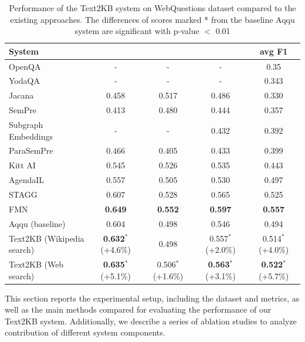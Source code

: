 \begin{table}[ht!]
\centering
\begin{tabular}{| p{5.2cm} | c | c | c | c | }
\hline
System & \centering{avg Recall} & \centering{avg Precision} & \centering{F1 of avg P and R} & avg F1 \\
\hline
OpenQA \cite{Fader:2014:OQA:2623330.2623677} & - & - & - & 0.35 \\
YodaQA \cite{baudivs2015yodaqa} & - & - & - & 0.343 \\
\hline
Jacana \cite{YaoD14} & 0.458 & 0.517 & 0.486 & 0.330\\
SemPre \cite{BerantCFL13:sempre} & 0.413 & 0.480 & 0.444 & 0.357\\
Subgraph Embeddings \cite{BordesCW14:emnlp} & - & - & 0.432 & 0.392\\
ParaSemPre \cite{BerantL14:parasempre} & 0.466 & 0.405 & 0.433 & 0.399\\
Kitt AI \cite{yao-scratch-qa-naacl2015} & 0.545 & 0.526 & 0.535 & 0.443\\
AgendaIL \cite{berant2015imitation} & 0.557 & 0.505 & 0.530 & 0.497\\
STAGG \cite{yih2014semantic} & 0.607 & 0.528 & 0.565 & 0.525\\
FMN \cite{jain2016question} & \textbf{0.649} & \textbf{0.552} & \textbf{0.597} & \textbf{0.557}\\
\hline
Aqqu (baseline) \cite{bastmore:cikm:2015:aquu} & 0.604 & 0.498 & 0.546 & 0.494\\
Text2KB (Wikipedia search) & \textbf{0.632}$^*$ \tiny{(+4.6\%)} & 0.498 & 0.557$^*$ \tiny{(+2.0\%)} & 0.514$^*$ \tiny{(+4.0\%)} \\
Text2KB (Web search) & \textbf{0.635}$^*$ \tiny{(+5.1\%)} & 0.506$^*$ \tiny{(+1.6\%)} & \textbf{0.563}$^*$ \tiny{(+3.1\%)} & \textbf{0.522}$^*$ \tiny{(+5.7\%)} \\
\hline
\end{tabular}
\caption{Performance of the Text2KB system on WebQuestions dataset compared to the existing approaches. The differences of scores marked * from the baseline Aqqu system are significant with p-value $<$ 0.01}
\label{table:text2kb:webquestions_results}
\end{table}

This section reports the experimental setup, including the dataset and metrics, as well as the main methods compared for evaluating the performance of our Text2KB system. Additionally, we describe a series of ablation studies to analyze contribution of different system components.

